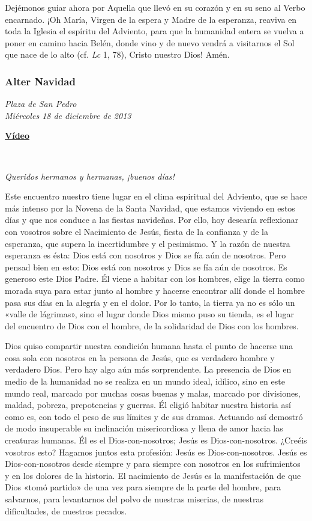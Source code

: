 Dejémonos guiar ahora por Aquella que llevó en su corazón y en su seno
al Verbo encarnado. ¡Oh María, Virgen de la espera y Madre de la
esperanza, reaviva en toda la Iglesia el espíritu del Adviento, para que
la humanidad entera se vuelva a poner en camino hacia Belén, donde vino
y de nuevo vendrá a visitarnos el Sol que nace de lo alto (cf. \emph{Lc}
1, 78), Cristo nuestro Dios! Amén.

\subsubsection{Alter Navidad}
\emph{Plaza de San Pedro}\\
\emph{Miércoles 18 de diciembre de 2013}

\textbf{\href{http://player.rv.va/vaticanplayer.asp?language=it\&tic=VA_L54LHQWY}{Vídeo}}

~

\emph{Queridos hermanos y hermanas, ¡buenos días!}

Este encuentro nuestro tiene lugar en el clima espiritual del Adviento,
que se hace más intenso por la Novena de la Santa Navidad, que estamos
viviendo en estos días y que nos conduce a las fiestas navideñas. Por
ello, hoy desearía reflexionar con vosotros sobre el Nacimiento de
Jesús, fiesta de la confianza y de la esperanza, que supera la
incertidumbre y el pesimismo. Y la razón de nuestra esperanza es ésta:
Dios está con nosotros y Dios se fía aún de nosotros. Pero pensad bien
en esto: Dios está con nosotros y Dios se fía aún de nosotros. Es
generoso este Dios Padre. Él viene a habitar con los hombres, elige la
tierra como morada suya para estar junto al hombre y hacerse encontrar
allí donde el hombre pasa sus días en la alegría y en el dolor. Por lo
tanto, la tierra ya no es sólo un «valle de lágrimas», sino el lugar
donde Dios mismo puso su tienda, es el lugar del encuentro de Dios con
el hombre, de la solidaridad de Dios con los hombres.

Dios quiso compartir nuestra condición humana hasta el punto de hacerse
una cosa sola con nosotros en la persona de Jesús, que es verdadero
hombre y verdadero Dios. Pero hay algo aún más sorprendente. La
presencia de Dios en medio de la humanidad no se realiza en un mundo
ideal, idílico, sino en este mundo real, marcado por muchas cosas buenas
y malas, marcado por divisiones, maldad, pobreza, prepotencias y
guerras. Él eligió habitar nuestra historia así como es, con todo el
peso de sus límites y de sus dramas. Actuando así demostró de modo
insuperable su inclinación misericordiosa y llena de amor hacia las
creaturas humanas. Él es el Dios-con-nosotros; Jesús es
Dios-con-nosotros. ¿Creéis vosotros esto? Hagamos juntos esta profesión:
Jesús es Dios-con-nosotros. Jesús es Dios-con-nosotros desde siempre y
para siempre con nosotros en los sufrimientos y en los dolores de la
historia. El nacimiento de Jesús es la manifestación de que Dios «tomó
partido» de una vez para siempre de la parte del hombre, para salvarnos,
para levantarnos del polvo de nuestras miserias, de nuestras
dificultades, de nuestros pecados.

